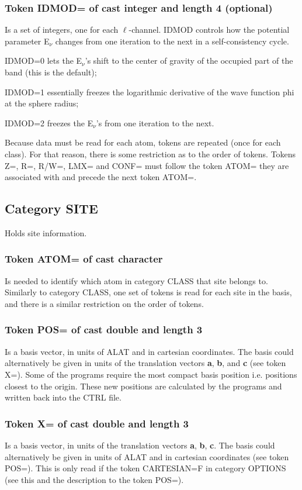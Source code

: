 \documentclass[aps,twocolumn,a4]{revtex4}
\begin{document}
\subsubsection{Token IDMOD= of cast integer and length 4 (optional)}
Is a set of integers, one for each $\ell $-channel.  IDMOD
controls how the potential parameter E$_\nu $ changes from one
iteration to the next in a self-consistency cycle.

IDMOD=0 lets the E$_\nu $'s
shift to the center of gravity of the occupied part
of the band (this is the default);

IDMOD=1 essentially freezes the
logarithmic derivative of the wave function phi at the sphere radius;

IDMOD=2 freezes the E$_\nu $'s from
one iteration to the next.

Because data must be read for each atom, tokens are repeated (once for
each class).  For that reason, there is some restriction as to the order
of tokens.  Tokens Z=, R=, R/W=, LMX= and CONF= must follow the token
ATOM= they are associated with and precede the next token ATOM=.

\subsection{Category SITE}
Holds site information.

\subsubsection{Token ATOM= of cast character}
Is needed to identify which atom in category CLASS that site
belongs to.  Similarly to category CLASS, one set of tokens is read for
each site in the basis, and there is a similar restriction on the order
of tokens.

\subsubsection{Token POS= of cast double and length 3}
Is a basis vector, in units of ALAT and in
cartesian coordinates. The basis could alternatively be given in units
of the translation vectors {\bf a}, {\bf b}, and {\bf c} (see token X=).
Some of the programs require the most compact basis position i.e.
positions closest to the origin. These new positions are calculated
by the programs and written back into the CTRL file.

\subsubsection{Token X= of cast double and length 3}
Is a basis vector, in units of the translation vectors {\bf a}, 
{\bf b}, {\bf c}. The basis could alternatively be given in units of
ALAT and in cartesian coordinates (see token POS=).
This is only read if the token CARTESIAN=F in
category OPTIONS (see this and the description to the token POS=).
\end{document}

